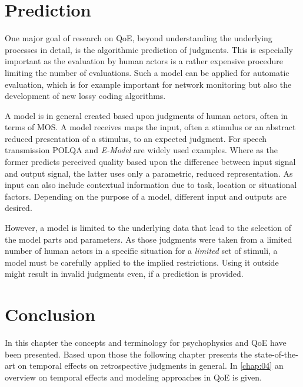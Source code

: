 \section{Prediction}
One major goal of research on \ac{QoE}, beyond understanding the underlying processes in detail, is the algorithmic prediction of judgments.
This is especially important as the evaluation by human actors is a rather expensive procedure limiting the number of evaluations.
Such a model can be applied for automatic evaluation, which is for example important for network monitoring but also the development of new lossy coding algorithms.

A model is in general created based upon judgments of human actors, often in terms of \ac{MOS}.
A model receives maps the input, often a stimulus or an abstract reduced presentation of a stimulus, to an expected judgment.
For speech transmission \ac{POLQA} \citep{itu-t_p.863:_2014} and \emph{E-Model} \citep{itu-t_g.107:_2014} are widely used examples.
Where as the former predicts perceived quality based upon the difference between input signal and output signal, the latter uses only a parametric, reduced representation.
As input can also include contextual information due to task, location or situational factors.
Depending on the purpose of a model, different input and outputs are desired.

However, a model is limited to the underlying data that lead to the selection of the model parts and parameters.
As those judgments were taken from a limited number of human actors in a specific situation for a \emph{limited} set of stimuli, a model must be carefully applied to the implied restrictions.
Using it outside might result in invalid judgments even, if a prediction is provided.

\section{Conclusion}
In this chapter the concepts and terminology for psychophysics and \ac{QoE} have been presented.
Based upon those the following chapter presents the state-of-the-art on temporal effects on retrospective judgments in general.
In \autoref{chap:04} an overview on temporal effects and modeling approaches in \ac{QoE} is given.